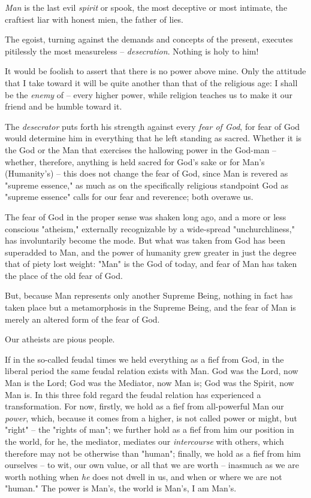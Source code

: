 \textit{Man} is the last evil \textit{spirit} or spook, the most deceptive or 
most intimate, the craftiest liar with honest mien, the father of lies.

The egoist, turning against the demands and concepts of the present, executes 
pitilessly the most measureless -- \textit{desecration}. Nothing is holy to 
him!

It would be foolish to assert that there is no power above mine. Only the 
attitude that I take toward it will be quite another than that of the 
religious age: I shall be the \textit{enemy} of -- every higher power, while 
religion teaches us to make it our friend and be humble toward it.

The \textit{desecrator} puts forth his strength against every \textit{fear of 
God}, for fear of God would determine him in everything that he left standing 
as sacred. Whether it is the God or the Man that exercises the hallowing power 
in the God-man -- whether, therefore, anything is held sacred for God's sake 
or for Man's (Humanity's) -- this does not change the fear of God, since Man 
is revered as "{}supreme essence,"{} as much as on the specifically religious 
standpoint God as "{}supreme essence"{} calls for our fear and reverence; both 
overawe us.

The fear of God in the proper sense was shaken long ago, and a more or less 
conscious "{}atheism,"{} externally recognizable by a wide-spread 
"{}unchurchliness,"{} has involuntarily become the mode. But what was taken 
from God has been superadded to Man, and the power of humanity grew greater in 
just the degree that of piety lost weight: "{}Man"{} is the God of today, and 
fear of Man has taken the place of the old fear of God.

But, because Man represents only another Supreme Being, nothing in fact has 
taken place but a metamorphosis in the Supreme Being, and the fear of Man is 
merely an altered form of the fear of God.

Our atheists are pious people.

If in the so-called feudal times we held everything as a fief from God, in the 
liberal period the same feudal relation exists with Man. God was the Lord, now 
Man is the Lord; God was the Mediator, now Man is; God was the Spirit, now Man 
is. In this three fold regard the feudal relation has experienced a 
transformation. For now, firstly, we hold as a fief from all-powerful Man our 
\textit{power}, which, because it comes from a higher, is not called power or 
might, but "{}right"{} -- the "{}rights of man"{}; we further hold as a fief 
from him our position in the world, for he, the mediator, mediates our 
\textit{intercourse} with others, which therefore may not be otherwise than 
"{}human"{}; finally, we hold as a fief from him ourselves -- to wit, our own 
value, or all that we are worth -- inasmuch as we are worth nothing when 
\textit{he} does not dwell in us, and when or where we are not "{}human."{} 
The power is Man's, the world is Man's, I am Man's.

